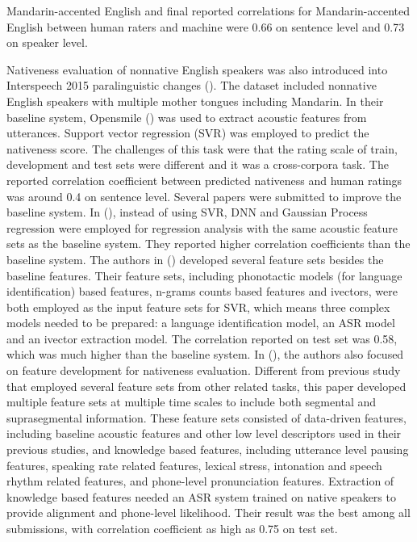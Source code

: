 Mandarin-accented English and final reported correlations for Mandarin-accented English between human raters and machine were 0.66 on sentence level and 0.73 on speaker level.

Nativeness evaluation of nonnative English speakers was also introduced into Interspeech 2015 paralinguistic changes (\cite{schuller2015interspeech}). The dataset included nonnative English speakers with multiple mother tongues including Mandarin. In their baseline system, Opensmile (\cite{eyben2010opensmile}) was used to extract acoustic features from utterances. Support vector regression (SVR) was employed to predict the nativeness score. The challenges of this task were that the rating scale of train, development and test sets were different and it was a cross-corpora task. The reported correlation coefficient between predicted nativeness and human ratings was around 0.4 on sentence level. Several papers were submitted to improve the baseline system. In (\cite{grosz2015assessing}), instead of using SVR, DNN and Gaussian Process regression were employed for regression analysis with the same acoustic feature sets as the baseline system. They reported higher correlation coefficients than the baseline system. The authors in (\cite{ribeiro2015combining}) developed several feature sets besides the baseline features. Their feature sets, including phonotactic models (for language identification) based features, n-grams counts based features and ivectors, were both employed as the input feature sets for SVR, which means three complex models needed to be prepared: a language identification model, an ASR model and an ivector extraction model. The correlation reported on test set was 0.58, which was much higher than the baseline system. In (\cite{black2015automated}), the authors also focused on feature development for nativeness evaluation. Different from previous study that employed several feature sets from other related tasks, this paper developed multiple feature sets at multiple time scales to include both segmental and suprasegmental information. These feature sets consisted of data-driven features, including baseline acoustic features and other low level descriptors used in their previous studies, and knowledge based features, including utterance level pausing features, speaking rate related features, lexical stress, intonation and speech rhythm related features, and phone-level pronunciation features. Extraction of knowledge based features needed an ASR system trained on native speakers to provide alignment and phone-level likelihood. Their result was the best among all submissions, with correlation coefficient as high as 0.75 on test set.

